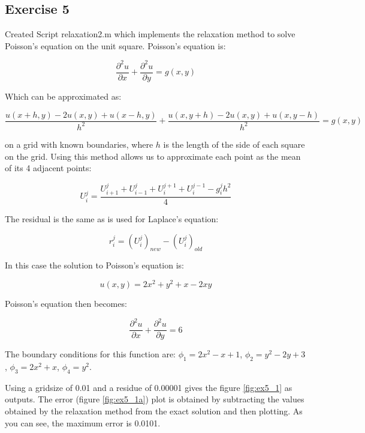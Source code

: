 \documentclass[11pt, oneside, titlepage]{article}   	%
\begin{document}
\subsection{Exercise 5}

Created Script relaxation2.m which implements the relaxation method to solve Poisson's equation on the unit square. Poisson's equation is:

\begin{equation}
\frac{\partial^2u}{\partial x} + \frac{\partial^2u}{\partial y} = g(x,y)
\end{equation}

Which can be approximated as:

\begin{equation}
\frac{u(x+h, y) - 2u(x, y) + u(x-h, y)}{h^2} + \frac{u(x, y+h) -2u(x, y) + u(x, y-h)}{h^2} = g(x,y)
\end{equation}

on a grid with known boundaries, where $h$ is the length of the side of each square on the grid. Using this method allows us to approximate each point as the mean of its 4 adjacent points:

\begin{equation}
U_i^j = \frac{U_{i+1}^j + U_{i-1}^j + U_i^{j+1} + U_i^{j-1} - g_i^jh^2}{4}
\end{equation}

The residual is the same as is used for Laplace's equation:

\begin{equation}
r^j_i = (U_i^j)_{new} - (U_i^j)_{old}
\end{equation}

In this case the solution to Poisson's equation is:

\begin{equation}
u(x,y) = 2x^2 +y^2 + x -2xy
\end{equation} 

Poisson's equation then becomes:

\begin{equation}
\frac{\partial^2u}{\partial x} + \frac{\partial^2u}{\partial y} = 6
\end{equation}

The boundary conditions for this function are: $\phi_1 = 2x^2 - x + 1$, $\phi_2 = y^2 -2y +3$, $\phi_3 = 2x^2 +x$, $\phi_4 = y^2$.

Using a gridsize of 0.01 and a residue of 0.00001 gives the figure \ref{fig:ex5_1} as outputs. The error (figure \ref{fig:ex5_1a}) plot is obtained by subtracting the values obtained by the relaxation method from the exact solution and then plotting. As you can see, the maximum error is 0.0101. 
\end{document}
